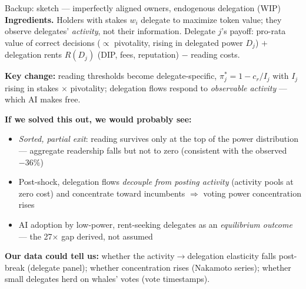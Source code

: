 \documentclass[11pt,aspectratio=169]{beamer}
\begin{document}
\begin{frame}[noframenumbering,label=appext]{Backup: sketch --- imperfectly aligned owners, endogenous delegation (WIP)}
  \small
  \textbf{Ingredients.} Holders with stakes $w_i$ delegate to maximize token
  value; they observe delegates' \emph{activity}, not their information.
  Delegate $j$'s payoff: pro-rata value of correct decisions ($\propto$
  pivotality, rising in delegated power $D_j$) $+$ delegation rents $R(D_j)$
  (DIP, fees, reputation) $-$ reading costs.
  \vspace{0.25em}

  \textbf{Key change:} reading thresholds become delegate-specific,
  $\pi^*_j = 1 - c_r/I_j$ with $I_j$ rising in stakes $\times$ pivotality;
  delegation flows respond to \emph{observable activity} --- which AI makes free.
  \vspace{0.3em}

  \textbf{If we solved this out, we would probably see:}
  \begin{itemize}
    \setlength{\itemsep}{0.25em}
    \item \small \emph{Sorted, partial exit}: reading survives only at the top
      of the power distribution --- aggregate readership falls but not to zero
      (consistent with the observed $-36\%$)
    \item \small Post-shock, delegation flows \emph{decouple from posting
      activity} (activity pools at zero cost) and concentrate toward incumbents
      $\Rightarrow$ voting power concentration rises
    \item \small AI adoption by low-power, rent-seeking delegates as an
      \emph{equilibrium outcome} --- the 27$\times$ gap derived, not assumed
  \end{itemize}
  \vspace{0.3em}
  \textbf{Our data could tell us:} whether the activity$\to$delegation elasticity
  falls post-break (delegate panel); whether concentration rises (Nakamoto
  series); whether small delegates herd on whales' votes (vote timestamps).
\end{frame}
\end{document}
